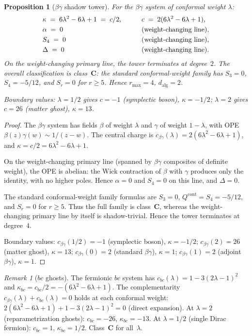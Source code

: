 \documentclass[11pt,reqno]{amsart}
\newtheorem{proposition}[theorem]{Proposition}
\theoremstyle{definition}
\theoremstyle{remark}
\newtheorem{remark}[theorem]{Remark}
\numberwithin{equation}{section}
\begin{document}
\begin{proposition}[$\beta\gamma$ shadow
tower]\label{prop:betagamma}
For the $\beta\gamma$ system of conformal weight $\lambda$:
\begin{alignat*}{2}
 &\kappa \;=\; 6\lambda^2 - 6\lambda + 1
 \;=\; c/2,
 \qquad
 &&c \;=\; 2(6\lambda^2 - 6\lambda + 1), \\
 &\alpha \;=\; 0
 &&\textup{(weight-changing line)}, \\
 &S_4 \;=\; 0
 &&\textup{(weight-changing line)}, \\
 &\Delta \;=\; 0
 &&\textup{(weight-changing line)}.
\end{alignat*}
On the weight-changing primary line, the tower terminates
at degree~$2$. The overall classification is
class~$\mathbf{C}$: the standard conformal-weight family has
$S_3 = 0$, $S_4 = -5/12$, and $S_r = 0$ for $r \ge 5$.
Hence $r_{\max} = 4$,
$d_{\mathrm{alg}} = 2$.

Boundary values: $\lambda = 1/2$ gives
$c = -1$ (symplectic boson), $\kappa = -1/2$;
$\lambda = 2$ gives $c = 26$ (matter ghost),
$\kappa = 13$.
\end{proposition}

\begin{proof}
The $\beta\gamma$ system has fields $\beta$ of weight
$\lambda$ and $\gamma$ of weight $1 - \lambda$, with OPE
$\beta(z)\gamma(w) \sim 1/(z-w)$. The central charge is
$c_{\beta\gamma}(\lambda) = 2(6\lambda^2 - 6\lambda + 1)$,
and $\kappa = c/2 = 6\lambda^2 - 6\lambda + 1$.

On the weight-changing primary line (spanned by $\beta\gamma$
composites of definite weight), the OPE is abelian: the
Wick contraction of $\beta$ with $\gamma$ produces only the
identity, with no higher poles. Hence $\alpha = 0$ and
$S_4 = 0$ on this line, and $\Delta = 0$.

The standard conformal-weight family formulas are
$S_3 = 0$, $Q^{\mathrm{cont}} = S_4 = -5/12$, and
$S_r = 0$ for $r \ge 5$.
Thus the full family is class~$\mathbf{C}$, whereas the
weight-changing primary line by itself is shadow-trivial.
Hence the tower terminates at degree~$4$.

Boundary values: $c_{\beta\gamma}(1/2) = -1$ (symplectic
boson), $\kappa = -1/2$; $c_{\beta\gamma}(2) = 26$ (matter
ghost), $\kappa = 13$; $c_{\beta\gamma}(0) = 2$ (standard
$\beta\gamma$), $\kappa = 1$;
$c_{\beta\gamma}(1) = 2$ (adjoint $\beta\gamma$),
$\kappa = 1$.
\end{proof}

\begin{remark}[$bc$ ghosts]\label{rem:bc-ghosts}
The fermionic $bc$ system has
$c_{bc}(\lambda) = 1 - 3(2\lambda-1)^2$ and
$\kappa_{bc} = c_{bc}/2 = -(6\lambda^2 - 6\lambda + 1)$.
The complementarity
$c_{\beta\gamma}(\lambda) + c_{bc}(\lambda) = 0$
holds at each conformal weight:
$2(6\lambda^2 - 6\lambda + 1) + 1 - 3(2\lambda-1)^2 = 0$
(direct expansion). At $\lambda = 2$
(reparametrization ghosts): $c_{bc} = -26$,
$\kappa_{bc} = -13$. At $\lambda = 1/2$ (single Dirac
fermion): $c_{bc} = 1$, $\kappa_{bc} = 1/2$.
Class~$\mathbf{C}$ for all~$\lambda$.
\end{remark}
\end{document}
